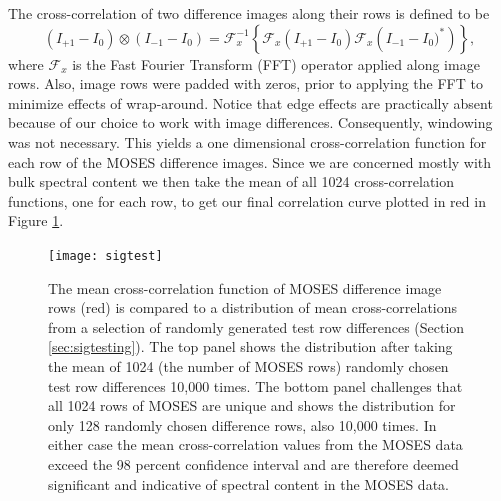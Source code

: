  	
        The cross-correlation of two difference images along their rows is defined to be
        \begin{equation}
         \left(I_{+1}-I_0\right) \otimes \left(I_{-1}-I_0\right) = \mathcal{F}_x^{-1} \left\{\mathcal{F}_x\left(I_{+1}-I_0 \right)\mathcal{F}_x\left( I_{-1}-I_0)^* \right)  \right\},
         \label{eqn:cross_correlate}
        \end{equation}
        where $\mathcal{F}_x$ is the Fast Fourier Transform (FFT) operator applied along image rows.  
        Also, image rows were padded with zeros, prior to applying the FFT to minimize effects of wrap-around. 
        Notice that edge effects are practically absent because of our choice to work with image differences. 
        Consequently, windowing was not necessary.
        This yields a one dimensional cross-correlation function for each row of the MOSES difference images.  
        Since we are concerned mostly with bulk spectral content we then take the mean of all 1024 cross-correlation functions, one for each row, to get our final correlation curve plotted in red in Figure \ref{fig:sigtest}. 
		 
		 \begin{figure}
		 	\centering
		 	\texttt{[image: sigtest]}
            \caption{The mean cross-correlation function of MOSES difference image rows (red) is compared to a distribution of mean cross-correlations from a selection of randomly generated test row differences (Section \ref{sec:sigtesting}). 
            The top panel shows the distribution after taking the mean of 1024 (the number of MOSES rows) randomly chosen test row differences 10,000 times.  
            The bottom panel challenges that all 1024 rows of MOSES are unique and shows the distribution for only 128 randomly chosen difference rows, also 10,000 times.  
            In either case the mean cross-correlation values from the MOSES data exceed the 98 percent confidence interval and are therefore deemed significant and indicative of spectral content in the MOSES data.}
		 	\label{fig:sigtest}
		 \end{figure}
		 
